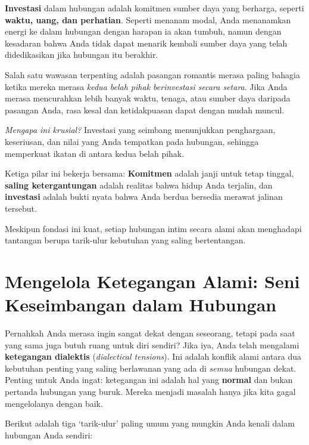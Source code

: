 \documentclass[
  letterpaper,
  DIV=11,
  numbers=noendperiod]{scrreprt}
\begin{document}
\textbf{Investasi} dalam hubungan adalah komitmen sumber daya yang
berharga, seperti \textbf{waktu, uang, dan perhatian}. Seperti menanam
modal, Anda menanamkan energi ke dalam hubungan dengan harapan ia akan
tumbuh, namun dengan kesadaran bahwa Anda tidak dapat menarik kembali
sumber daya yang telah didedikasikan jika hubungan itu berakhir.

Salah satu wawasan terpenting adalah pasangan romantis merasa paling
bahagia ketika mereka merasa \emph{kedua belah pihak berinvestasi secara
setara}. Jika Anda merasa mencurahkan lebih banyak waktu, tenaga, atau
sumber daya daripada pasangan Anda, rasa kesal dan ketidakpuasan dapat
dengan mudah muncul.

\emph{Mengapa ini krusial?} Investasi yang seimbang menunjukkan
penghargaan, keseriusan, dan nilai yang Anda tempatkan pada hubungan,
sehingga memperkuat ikatan di antara kedua belah pihak.

Ketiga pilar ini bekerja bersama: \textbf{Komitmen} adalah janji untuk
tetap tinggal, \textbf{saling ketergantungan} adalah realitas bahwa
hidup Anda terjalin, dan \textbf{investasi} adalah bukti nyata bahwa
Anda berdua bersedia merawat jalinan tersebut.

Meskipun fondasi ini kuat, setiap hubungan intim secara alami akan
menghadapi tantangan berupa tarik-ulur kebutuhan yang saling
bertentangan.

\section{Mengelola Ketegangan Alami: Seni Keseimbangan dalam
Hubungan}\label{mengelola-ketegangan-alami-seni-keseimbangan-dalam-hubungan}

Pernahkah Anda merasa ingin sangat dekat dengan seseorang, tetapi pada
saat yang sama juga butuh ruang untuk diri sendiri? Jika iya, Anda telah
mengalami \textbf{ketegangan dialektis} (\emph{dialectical tensions}).
Ini adalah konflik alami antara dua kebutuhan penting yang saling
berlawanan yang ada di \emph{semua} hubungan dekat. Penting untuk Anda
ingat: ketegangan ini adalah hal yang \textbf{normal} dan bukan pertanda
hubungan yang buruk. Mereka menjadi masalah hanya jika kita gagal
mengelolanya dengan baik.

Berikut adalah tiga `tarik-ulur' paling umum yang mungkin Anda kenali
dalam hubungan Anda sendiri:
\end{document}
